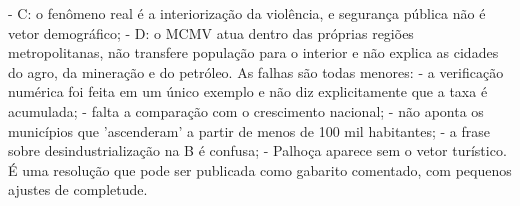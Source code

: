 \documentclass{article}%
\begin{document}
{-} C: o fenômeno real é a interiorização da violência, e segurança pública não é vetor demográfico;\newline%
{-} D: o MCMV atua dentro das próprias regiões metropolitanas, não transfere população para o interior e não explica as cidades do agro, da mineração e do petróleo.\newline%
\newline%
As falhas são todas menores:\newline%
{-} a verificação numérica foi feita em um único exemplo e não diz explicitamente que a taxa é acumulada;\newline%
{-} falta a comparação com o crescimento nacional;\newline%
{-} não aponta os municípios que 'ascenderam' a partir de menos de 100 mil habitantes;\newline%
{-} a frase sobre desindustrialização na B é confusa;\newline%
{-} Palhoça aparece sem o vetor turístico.\newline%
\newline%
É uma resolução que pode ser publicada como gabarito comentado, com pequenos ajustes de completude.%
\end{document}

